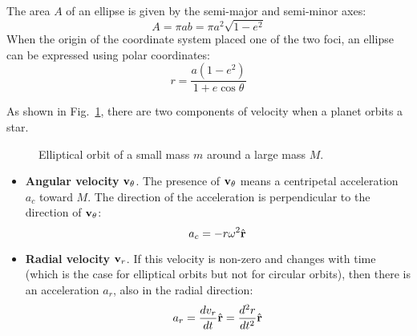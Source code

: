 \documentclass[11pt]{article}
\newcommand{\mb}[1]{
  \ensuremath\mathbf{#1}
}
\begin{document}
The area $A$ of an ellipse is given by the semi-major and semi-minor axes:
\begin{equation}
  A=\pi ab=\pi a^2\sqrt{1-e^2}
  \label{A2}
\end{equation}
When the origin of the coordinate system placed one of the two foci, an ellipse
can be expressed using polar coordinates:
\begin{equation}
  r=\frac{a(1-e^2)}{1+e\cos\theta}
  \label{ellipse-eq}
\end{equation}

As shown in Fig.~\ref{eorbit}, there are two components of velocity when a
planet orbits a star.
\begin{figure}[!ht]
  \centering
  \caption{Elliptical orbit of a small mass $m$ around a large mass $M$.}
  \label{eorbit}
\end{figure}
\begin{itemize}
\item\textbf{Angular velocity} $\mb{v}_\theta$. The presence of $\mb{v}_\theta$
  means a centripetal acceleration $a_c$ toward $M$. The direction of the
  acceleration is perpendicular to the direction of $\mb{v}_\theta$:
  \begin{equation}
    a_c=-r\omega^2\hat{\mb{r}}
  \end{equation}
\item\textbf{Radial velocity} $\mb{v}_r$. If this velocity is non-zero and
  changes with time (which is the case for elliptical orbits but not for
  circular orbits), then there is an acceleration $a_r$, also in the radial
  direction:
  \begin{equation}
    a_r=\frac{dv_r}{dt}\hat{\mb{r}}=\frac{d^2r}{dt^2}\hat{\mb{r}}
  \end{equation}
\end{itemize}
\end{document}
